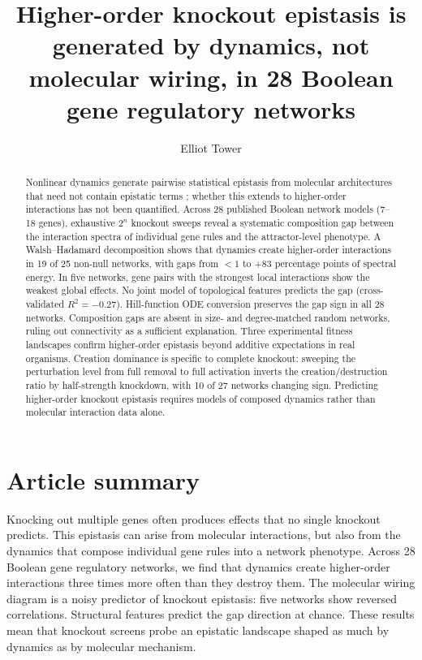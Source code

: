 \documentclass[10pt]{article}
\title{Higher-order knockout epistasis is generated by dynamics, not
molecular wiring, in 28 Boolean gene regulatory networks}
\author{Elliot Tower}
\affil{Visiting Researcher, University of Edinburgh \\ \texttt{elliot@mechanisticresearch.org}}
\begin{document}
\maketitle
\linenumbers
\doublespacing

\begin{abstract}
Nonlinear dynamics generate pairwise statistical epistasis from
molecular architectures that need not contain epistatic terms
\citep{gjuvsland2007statistical}; whether this extends to
higher-order interactions has not been quantified.
Across 28 published Boolean network models (7--18 genes), exhaustive
$2^n$ knockout sweeps reveal a systematic composition
gap between the interaction spectra of individual gene rules and the
attractor-level phenotype. A Walsh--Hadamard decomposition
shows that dynamics create higher-order interactions
in 19 of 25 non-null networks, with
gaps from $< 1$ to $+83$ percentage points of spectral
energy. In five networks, gene pairs with the strongest local
interactions show the weakest global effects. No joint model of
topological features predicts the gap (cross-validated
$R^2 = -0.27$). Hill-function ODE conversion preserves the gap sign
in all 28 networks. Composition gaps are absent in size- and
degree-matched random networks, ruling out connectivity as a
sufficient explanation. Three experimental fitness
landscapes confirm higher-order epistasis beyond additive
expectations in real organisms.
Creation dominance is specific to complete knockout:
sweeping the perturbation level from full removal to full
activation inverts the creation/destruction ratio by half-strength
knockdown, with 10 of 27 networks changing sign. Predicting
higher-order knockout epistasis requires models of composed dynamics
rather than molecular interaction data alone.
\end{abstract}

\section*{Article summary}
Knocking out multiple genes often produces effects that no single
knockout predicts. This epistasis can arise from molecular
interactions, but also from the dynamics that compose individual gene
rules into a network phenotype. Across 28 Boolean gene regulatory
networks, we find that dynamics create higher-order interactions three
times more often than they destroy them. The molecular wiring diagram
is a noisy predictor of knockout epistasis: five networks show reversed
correlations. Structural features predict the gap direction at chance.
These results mean that knockout screens probe an epistatic landscape
shaped as much by dynamics as by molecular mechanism.
\end{document}
